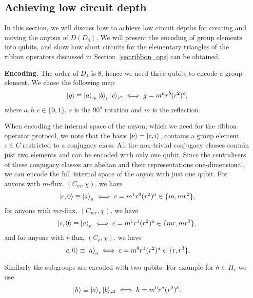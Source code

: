 \documentclass[a4paper,twocolumn,11pt]{quantumarticle}
\begin{document}
\subsection{Achieving low circuit depth }\label{subsec:enc}

In this section, we will discuss how to achieve low circuit depths for creating and moving the anyons of $D(D_4)$. We will present the encoding of group elements into qubits, and show how short circuits for the elementary triangles of the ribbon operators discussed in Section~\ref{sec:ribbon_ops} can be obtained.

\textbf{Encoding.} 
The order of $D_4$ is 8, hence we need three qubits to encode a group element.
We chose the following map
\begin{equation}
    \ket{g} \equiv \ket{a}_m\ket{b}_r\ket{c}_{r^2} \iff g = m^a r^b (r^2)^c,
\end{equation}
where $a,b,c \in \{0,1\}$, $r$ is the $90^{\text{o}}$ rotation and $m$ is the reflection.


When encoding the internal space of the anyon, which we need for the ribbon operator protocol, we note that the basis $\ket{\nu} = \ket{c, i}$, contains a group element $c\in C$ restricted to a conjugacy class. All the non-trivial conjugacy classes contain just two elements and can be encoded with only one qubit. Since the centralisers of these conjugacy classes are abelian and their representations one-dimensional, we can encode the full internal space of the anyon with just one qubit. For anyons with $m$-flux, $(C_m,\chi)$,
we have
\begin{equation}\label{eq:enc_C}
	\ket{c, 0} \equiv \ket{a}_{a} \iff c = m^1 r^0(r^2)^a \in \{m , mr^2\},
	\end{equation}
for anyons with $mr$-flux, $(C_{mr},\chi)$, we have	
\begin{equation}\label{eq:enc_C}
	\ket{c, 0} \equiv \ket{a}_{a} \iff c = m^1 r^1(r^2)^a \in \{mr , mr^3\},
	\end{equation}
	and for anyons with $r$-flux, $(C_r,\chi)$, we have
\begin{equation}\label{eq:enc_C}
	\ket{c, 0} \equiv \ket{a}_{a} \iff c = m^0 r^1(r^2)^a \in \{r , r^3\}.	
\end{equation}
			


Similarly the subgroups are encoded with two qubits. For example for $h\in H_r$ we use\begin{equation}
    \ket{h} \equiv \ket{a}_r\ket{b}_{r^2} \iff h = m^0r^a(r^2)^b.
\end{equation}
\end{document}
